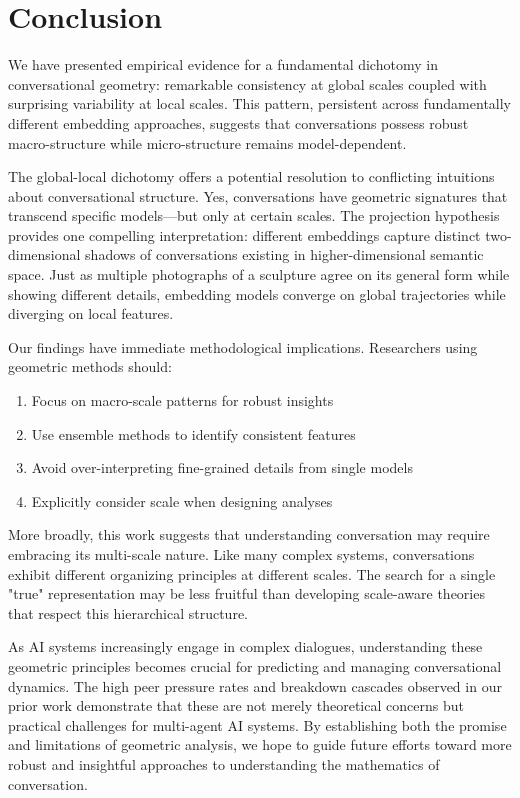 \documentclass[11pt,letterpaper]{article}
\begin{document}
\section{Conclusion}

We have presented empirical evidence for a fundamental dichotomy in conversational geometry: remarkable consistency at global scales coupled with surprising variability at local scales. This pattern, persistent across fundamentally different embedding approaches, suggests that conversations possess robust macro-structure while micro-structure remains model-dependent.

The global-local dichotomy offers a potential resolution to conflicting intuitions about conversational structure. Yes, conversations have geometric signatures that transcend specific models—but only at certain scales. The projection hypothesis provides one compelling interpretation: different embeddings capture distinct two-dimensional shadows of conversations existing in higher-dimensional semantic space. Just as multiple photographs of a sculpture agree on its general form while showing different details, embedding models converge on global trajectories while diverging on local features.

Our findings have immediate methodological implications. Researchers using geometric methods should:
\begin{enumerate}
\item Focus on macro-scale patterns for robust insights
\item Use ensemble methods to identify consistent features
\item Avoid over-interpreting fine-grained details from single models
\item Explicitly consider scale when designing analyses
\end{enumerate}

More broadly, this work suggests that understanding conversation may require embracing its multi-scale nature. Like many complex systems, conversations exhibit different organizing principles at different scales. The search for a single "true" representation may be less fruitful than developing scale-aware theories that respect this hierarchical structure.

As AI systems increasingly engage in complex dialogues, understanding these geometric principles becomes crucial for predicting and managing conversational dynamics. The high peer pressure rates and breakdown cascades observed in our prior work demonstrate that these are not merely theoretical concerns but practical challenges for multi-agent AI systems. By establishing both the promise and limitations of geometric analysis, we hope to guide future efforts toward more robust and insightful approaches to understanding the mathematics of conversation.
\end{document}
